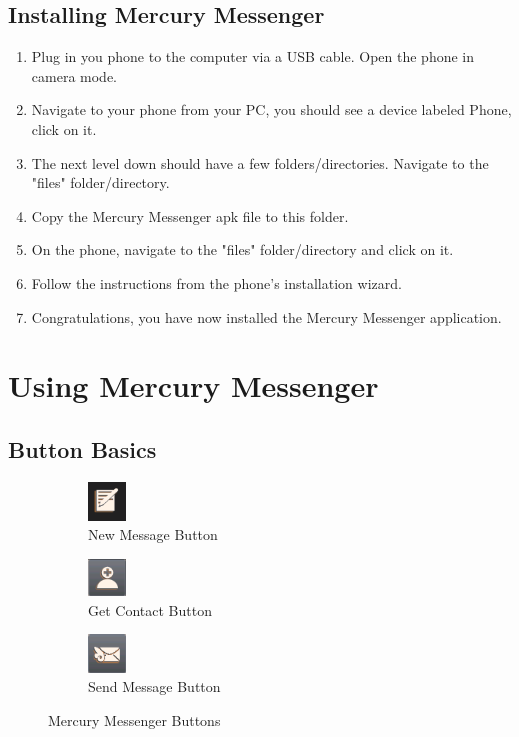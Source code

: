\documentclass{article}
\begin{document}
\subsection{Installing Mercury Messenger}
\begin{enumerate}
\item Plug in you phone to the computer via a USB cable. Open the phone in camera mode.
\item Navigate to your phone from your PC, you should see a device labeled Phone, click on it.
\item The next level down should have a few folders/directories. Navigate to the "files" folder/directory.
\item Copy the Mercury Messenger apk file to this folder.
\item On the phone, navigate to the "files" folder/directory and click on it.
\item Follow the instructions from the phone's installation wizard.
\item Congratulations, you have now installed the Mercury Messenger application.
\end{enumerate}






\section{Using Mercury Messenger}
\label{sec:UsingMercMess}

\subsection{Button Basics}

\begin{figure}[h!]
\centering
	\begin{subfigure}[b]{0.3\textwidth}
		\includegraphics[width=1cm]{"./Screen_shots/New_Message_Button"}{}
		\caption{New Message Button}
	\end{subfigure} %
	\begin{subfigure}[b]{0.3\textwidth}
\includegraphics[width=1cm]{"./Screen_shots/Get_Contact_Button"}{}
\caption{Get Contact Button}
\label{fig:GetContactButton}
	\end{subfigure}
	\begin{subfigure}[b]{0.3\textwidth}
\includegraphics[width=1cm]{"./Screen_shots/Send_Message_Button"}{}
\caption{Send Message Button}
\label{fig:sendMessage}
	\end{subfigure}
	\caption{Mercury Messenger Buttons}

\end{figure}
\end{document}
